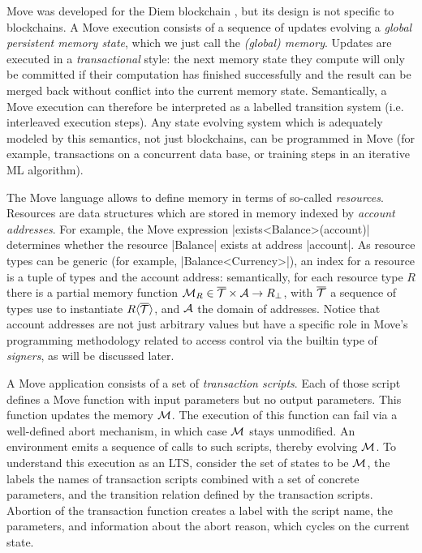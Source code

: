 
Move was developed for the Diem blockchain \cite{DIEM}, but its design is not
specific to blockchains.  A Move execution consists of a sequence of updates
evolving a \emph{global persistent memory state}, which we just call the
\emph{(global) memory}.  Updates are executed in a \emph{transactional} style:
the next memory state they compute will only be committed if their computation
has finished successfully and the result can be merged back without conflict
into the current memory state. Semantically, a Move execution can therefore be
interpreted as a labelled transition system (i.e. interleaved execution
steps). Any state evolving system which is adequately modeled by this semantics,
not just blockchains, can be programmed in Move (for example, transactions on a
concurrent data base, or training steps in an iterative ML algorithm).

The Move language allows to define memory in terms of so-called
\emph{resources}.  Resources are data structures which are stored in memory
indexed by \emph{account addresses}. For example, the Move expression
|exists<Balance>(account)| determines whether the resource |Balance| exists at
address |account|. As resource types can be generic (for example,
|Balance<Currency>|), an index for a resource is a tuple of types and the
account address: semantically, for each resource type $R$ there is a partial
memory function $\mathcal{M}_R \in \overline{\mathcal{T}} \times \mathcal{A} \rightarrow R_\bot$,
with $\overline{\mathcal{T}}$ a sequence of types use to instantiate
$R\langle\overline{\mathcal{T}}\rangle$, and $\mathcal{A}$ the domain of addresses. Notice that
account addresses are not just arbitrary values but have a specific role in
Move's programming methodology related to access control via the builtin type of
\emph{signers}, as will be discussed later.

A Move application consists of a set of \emph{transaction scripts}. Each of
those script defines a Move function with input parameters but no output
parameters.  This function updates the memory $\mathcal{M}$. The execution of this
function can fail via a well-defined abort mechanism, in which case $\mathcal{M}$
stays unmodified. An environment emits a sequence of calls to such scripts,
thereby evolving $\mathcal{M}$. To understand this execution as an LTS, consider the
set of states to be $\mathcal{M}$, the labels the names of transaction scripts
combined with a set of concrete parameters, and the transition relation defined
by the transaction scripts. Abortion of the transaction function creates a label
with the script name, the parameters, and information about the abort reason,
which cycles on the current state.


